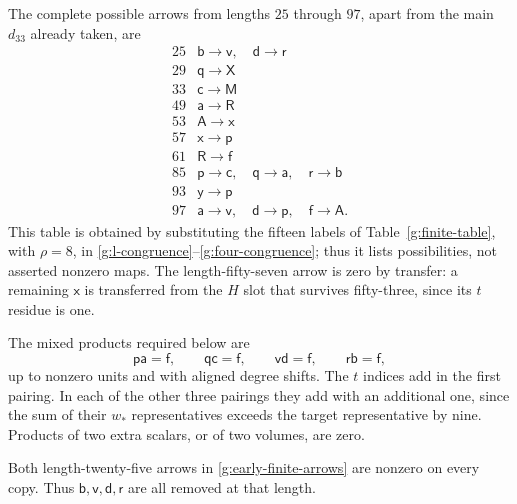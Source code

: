 The complete possible arrows from lengths $25$ through
$97$, apart from the main $d_{33}$ already taken, are
\begin{equation}\label{g:early-finite-arrows}
\begin{array}{c|l}
25&\mathsf b\longrightarrow\mathsf v,\quad
    \mathsf d\longrightarrow\mathsf r\\
29&\mathsf q\longrightarrow\mathsf X\\
33&\mathsf c\longrightarrow\mathsf M\\
49&\mathsf a\longrightarrow\mathsf R\\
53&\mathsf A\longrightarrow\mathsf x\\
57&\mathsf x\longrightarrow\mathsf p\\
61&\mathsf R\longrightarrow\mathsf f\\
85&\mathsf p\longrightarrow\mathsf c,\quad
    \mathsf q\longrightarrow\mathsf a,\quad
    \mathsf r\longrightarrow\mathsf b\\
93&\mathsf y\longrightarrow\mathsf p\\
97&\mathsf a\longrightarrow\mathsf v,\quad
    \mathsf d\longrightarrow\mathsf p,\quad
    \mathsf f\longrightarrow\mathsf A.
\end{array}
\end{equation}
This table is obtained by substituting the fifteen labels
of Table~\ref{g:finite-table}, with $\rho=8$, in
\eqref{g:l-congruence}--\eqref{g:four-congruence}; thus
it lists possibilities, not asserted nonzero maps.
The length-fifty-seven arrow is zero by transfer: a
remaining $\mathsf x$ is transferred from the $H$ slot
that survives fifty-three, since its $t$ residue is one.

The mixed products required below are
\begin{equation}\label{g:finite-products}
 \mathsf p\mathsf a=\mathsf f,\qquad
 \mathsf q\mathsf c=\mathsf f,\qquad
 \mathsf v\mathsf d=\mathsf f,\qquad
 \mathsf r\mathsf b=\mathsf f,
\end{equation}
up to nonzero units and with aligned degree shifts.
The $t$ indices add in the first pairing.  In each of
the other three pairings they add with an additional
one, since the sum of their $w_*$ representatives
exceeds the target representative by nine.  Products
of two extra scalars, or of two volumes, are zero.

\begin{lemma}\label{g:d25-nonzero}
Both length-twenty-five arrows in
\eqref{g:early-finite-arrows} are nonzero on every
copy.  Thus $\mathsf b,\mathsf v,\mathsf d,\mathsf r$
are all removed at that length.
\end{lemma}

